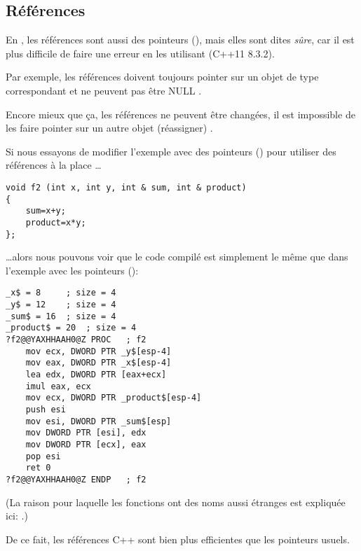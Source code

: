\subsection{Références}
\label{cpp_references}

En \Cpp, les références sont aussi des pointeurs (), mais
elles sont dites \emph{sûre}, car il est plus difficile de faire une erreur en les
utilisant (C++11 8.3.2). %

Par exemple, les références doivent toujours pointer sur un objet de type correspondant
et ne peuvent pas être NULL
.

Encore mieux que ça, les références ne peuvent être changées, il est impossible de
les faire pointer sur un autre objet (réassigner)
.

Si nous essayons de modifier l'exemple avec des pointeurs ()
pour utiliser des références à la place \dots

\begin{lstlisting}[style=customc]
void f2 (int x, int y, int & sum, int & product)
{
	sum=x+y;
	product=x*y;
};
\end{lstlisting}

\dots alors nous pouvons voir que le code compilé est simplement le même que dans
l'exemple avec les pointeurs ():

\begin{lstlisting}[caption=MSVC 2010 \Optimizing,style=customasmx86]
_x$ = 8		; size = 4
_y$ = 12	; size = 4
_sum$ = 16	; size = 4
_product$ = 20	; size = 4
?f2@@YAXHHAAH0@Z PROC	; f2
	mov	ecx, DWORD PTR _y$[esp-4]
	mov	eax, DWORD PTR _x$[esp-4]
	lea	edx, DWORD PTR [eax+ecx]
	imul eax, ecx
	mov ecx, DWORD PTR _product$[esp-4]
	push esi
	mov	esi, DWORD PTR _sum$[esp]
	mov	DWORD PTR [esi], edx
	mov	DWORD PTR [ecx], eax
	pop	esi
	ret	0
?f2@@YAXHHAAH0@Z ENDP	; f2
\end{lstlisting}

(La raison pour laquelle les fonctions \Cpp ont des noms aussi étranges est expliquée ici: .)

De ce fait, les références C++ sont bien plus efficientes que les pointeurs usuels.
